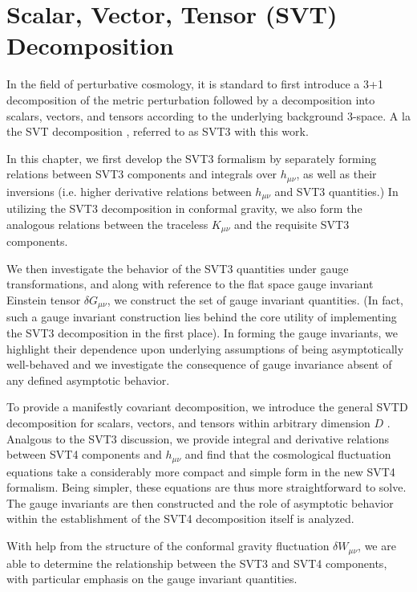 
\chapter{Scalar, Vector, Tensor (SVT) Decomposition}
\label{c:scalar_vector_tensor_basis}

In the field of perturbative cosmology, it is standard to first introduce a 3+1 decomposition of the metric perturbation followed by a decomposition into  scalars, vectors, and tensors according to the underlying background 3-space. A la the SVT decomposition \cite{ellis_maartens_maccallum_2009, bertschinger_2000, bardeen_1980, mukhanov_1992}, referred to as SVT3 with this work. 

In this chapter, we first develop the SVT3 formalism by separately forming relations between SVT3 components and integrals over $h_{\mu\nu}$, as well as their inversions (i.e. higher derivative relations between $h_{\mu\nu}$ and SVT3 quantities.) In utilizing the SVT3 decomposition in conformal gravity, we also form the analogous relations between the traceless $K_{\mu\nu}$ and the requisite SVT3 components.

We then investigate the behavior of the SVT3 quantities under gauge transformations, and along with reference to the flat space gauge invariant Einstein tensor $\delta G_{\mu\nu}$, we construct the set of gauge invariant quantities. (In fact, such a gauge invariant construction lies behind the core utility of implementing the SVT3 decomposition in the first place). In forming the gauge invariants, we highlight their dependence upon underlying assumptions of being asymptotically well-behaved and we investigate the consequence of gauge invariance absent of any defined asymptotic behavior. 

To provide a manifestly covariant decomposition, we introduce the general SVTD decomposition for scalars, vectors, and tensors within arbitrary dimension $D$ \cite{phelps_2019}. Analgous to the SVT3 discussion, we provide integral and derivative relations between SVT4 components and $h_{\mu\nu}$ and find that the cosmological fluctuation equations take a considerably more compact and simple form in the new SVT4 formalism. Being simpler, these equations are thus more straightforward to solve. The gauge invariants are then constructed and the role of asymptotic behavior within the establishment of the SVT4 decomposition itself is analyzed. 

With help from the structure of the conformal gravity fluctuation $\delta W_{\mu\nu}$, we are able to determine the relationship between the SVT3 and SVT4 components, with particular emphasis on the gauge invariant quantities.

